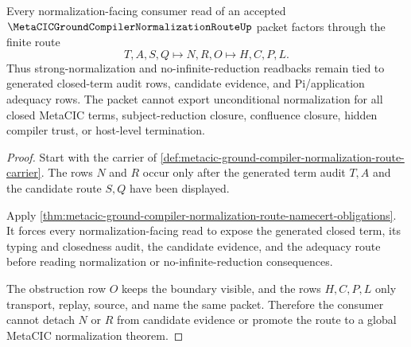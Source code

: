 \begin{theorem}
\label{thm:metacic-ground-compiler-normalization-route-candidate-nonescape}
Every normalization-facing consumer read of an accepted $\MetaCICGroundCompilerNormalizationRouteUp$ packet factors through the finite route
$$
T,A,S,Q \longmapsto N,R,O \longmapsto H,C,P,L .
$$
Thus strong-normalization and no-infinite-reduction readbacks remain tied to generated closed-term audit rows, candidate evidence, and Pi/application adequacy rows. The packet cannot export unconditional normalization for all closed MetaCIC terms, subject-reduction closure, confluence closure, hidden compiler trust, or host-level termination.
\end{theorem}
\begin{proof}
Start with the carrier of \autoref{def:metacic-ground-compiler-normalization-route-carrier}. The rows $N$ and $R$ occur only after the generated term audit $T,A$ and the candidate route $S,Q$ have been displayed.

Apply \autoref{thm:metacic-ground-compiler-normalization-route-namecert-obligations}. It forces every normalization-facing read to expose the generated closed term, its typing and closedness audit, the candidate evidence, and the adequacy route before reading normalization or no-infinite-reduction consequences.

The obstruction row $O$ keeps the boundary visible, and the rows $H,C,P,L$ only transport, replay, source, and name the same packet. Therefore the consumer cannot detach $N$ or $R$ from candidate evidence or promote the route to a global MetaCIC normalization theorem.
\end{proof}


